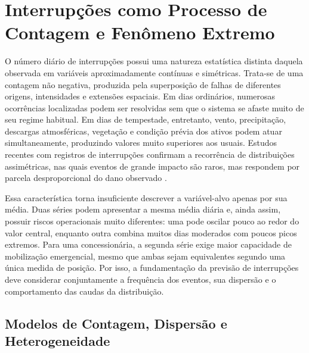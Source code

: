 \section{Interrupções como Processo de Contagem e Fenômeno Extremo}\label{sec:contagem_extremos}

O número diário de interrupções possui uma natureza estatística distinta daquela observada em variáveis aproximadamente contínuas e simétricas. Trata-se de uma contagem não negativa, produzida pela superposição de falhas de diferentes origens, intensidades e extensões espaciais. Em dias ordinários, numerosas ocorrências localizadas podem ser resolvidas sem que o sistema se afaste muito de seu regime habitual. Em dias de tempestade, entretanto, vento, precipitação, descargas atmosféricas, vegetação e condição prévia dos ativos podem atuar simultaneamente, produzindo valores muito superiores aos usuais. Estudos recentes com registros de interrupções confirmam a recorrência de distribuições assimétricas, nas quais eventos de grande impacto são raros, mas respondem por parcela desproporcional do dano observado \cite{saki2025compound, zhao2024variational}.

Essa característica torna insuficiente descrever a variável-alvo apenas por sua média. Duas séries podem apresentar a mesma média diária e, ainda assim, possuir riscos operacionais muito diferentes: uma pode oscilar pouco ao redor do valor central, enquanto outra combina muitos dias moderados com poucos picos extremos. Para uma concessionária, a segunda série exige maior capacidade de mobilização emergencial, mesmo que ambas sejam equivalentes segundo uma única medida de posição. Por isso, a fundamentação da previsão de interrupções deve considerar conjuntamente a frequência dos eventos, sua dispersão e o comportamento das caudas da distribuição.

\subsection{Modelos de Contagem, Dispersão e Heterogeneidade}

